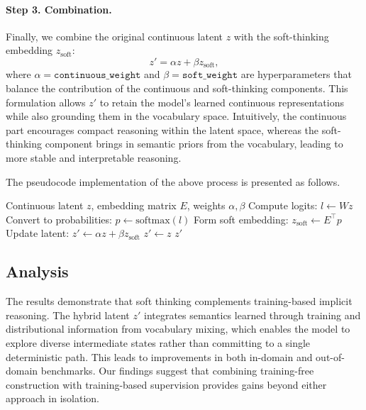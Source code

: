 \paragraph{Step 3. Combination.}  
Finally, we combine the original continuous latent $z$ with the soft-thinking embedding $z_{\text{soft}}$:
\[
z' = \alpha z + \beta z_{\text{soft}},
\]
where $\alpha = \texttt{continuous\_weight}$ and $\beta = \texttt{soft\_weight}$ are hyperparameters that balance the contribution of the continuous and soft-thinking components.  
This formulation allows $z'$ to retain the model’s learned continuous representations while also grounding them in the vocabulary space. Intuitively, the continuous part encourages compact reasoning within the latent space, whereas the soft-thinking component brings in semantic priors from the vocabulary, leading to more stable and interpretable reasoning.  

The pseudocode implementation of the above process is presented as follows.

\begin{algorithm}[h]
\caption{Soft Thinking with Continuous Tokens}
\label{alg:soft-thinking}
\begin{algorithmic}[1]
\Require Continuous latent $z$, embedding matrix $E$, weights $\alpha, \beta$
    \State Compute logits: $l \gets Wz$
    \State Convert to probabilities: $p \gets \text{softmax}(l)$
    \State Form soft embedding: $z_{\text{soft}} \gets E^\top p$
    \State Update latent: $z' \gets \alpha z + \beta z_{\text{soft}}$
\Else
    \State $z' \gets z$
\EndIf
\State \Return $z'$
\end{algorithmic}
\end{algorithm}


\subsection{Analysis}
The results demonstrate that soft thinking complements training-based implicit reasoning.
The hybrid latent $z'$ integrates semantics learned through training and distributional information from vocabulary mixing, which enables the model to explore diverse intermediate states rather than committing to a single deterministic path.
This leads to improvements in both in-domain and out-of-domain benchmarks.  
Our findings suggest that combining training-free construction with training-based supervision provides gains beyond either approach in isolation.




